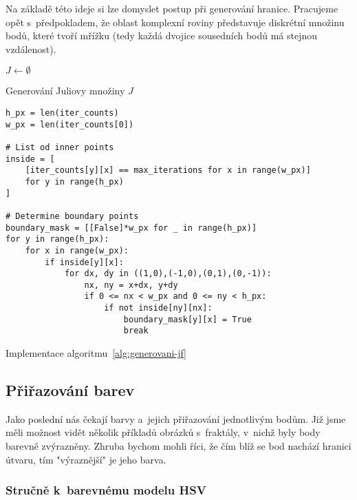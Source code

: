 Na základě této ideje si lze domyslet postup při generování hranice. Pracujeme opět s~předpokladem, že oblast komplexní roviny představuje diskrétní množinu bodů, které tvoří mřížku (tedy každá dvojice sousedních bodů má stejnou vzdálenost). 
\begin{algorithm}[h]
    $J\gets\emptyset$\;
    \;
    \caption{Generování Juliovy množiny $J$}
    \label{alg:generovani-jf}
\end{algorithm}
\begin{program}
\begin{lstlisting}[style=python]
h_px = len(iter_counts)
w_px = len(iter_counts[0])

# List od inner points
inside = [
    [iter_counts[y][x] == max_iterations for x in range(w_px)]
    for y in range(h_px)
]

# Determine boundary points
boundary_mask = [[False]*w_px for _ in range(h_px)]
for y in range(h_px):
    for x in range(w_px):
        if inside[y][x]:
            for dx, dy in ((1,0),(-1,0),(0,1),(0,-1)):
                nx, ny = x+dx, y+dy
                if 0 <= nx < w_px and 0 <= ny < h_px:
                    if not inside[ny][nx]:
                        boundary_mask[y][x] = True
                        break
\end{lstlisting}
    \caption{Implementace algoritmu~\ref{alg:generovani-jf}}
    \label{prog:generovani-jf}
\end{program}

\subsection{Přiřazování barev}\label{subsec:prirazovani-barev}

Jako poslední nás čekají barvy a~jejich přiřazování jednotlivým bodům. Již jsme měli možnost vidět několik příkladů obrázků s~fraktály, v~nichž byly body barevně zvýrazněny. Zhruba bychom mohli říci, že čím blíž se bod nachází hranici útvaru, tím "výraznější" je jeho barva.

\subsubsection{Stručně k~barevnému modelu HSV}

